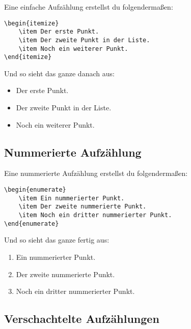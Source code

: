 Eine einfache Aufzählung erstellst du folgendermaßen:

\begin{lstlisting}
\begin{itemize}
	\item Der erste Punkt.
	\item Der zweite Punkt in der Liste.
	\item Noch ein weiterer Punkt.
\end{itemize}
\end{lstlisting}

Und so sieht das ganze danach aus:

\begin{itemize}
	\item Der erste Punkt.
	\item Der zweite Punkt in der Liste.
	\item Noch ein weiterer Punkt.
\end{itemize}

\subsection{Nummerierte Aufzählung}

Eine nummerierte Aufzählung erstellst du folgendermaßen:

\begin{lstlisting}
\begin{enumerate}
	\item Ein nummerierter Punkt.
	\item Der zweite nummerierte Punkt.
	\item Noch ein dritter nummerierter Punkt.
\end{enumerate}
\end{lstlisting}

Und so sieht das ganze fertig aus:

\begin{enumerate}
	\item Ein nummerierter Punkt.
	\item Der zweite nummerierte Punkt.
	\item Noch ein dritter nummerierter Punkt.
\end{enumerate}

\subsection{Verschachtelte Aufzählungen}

